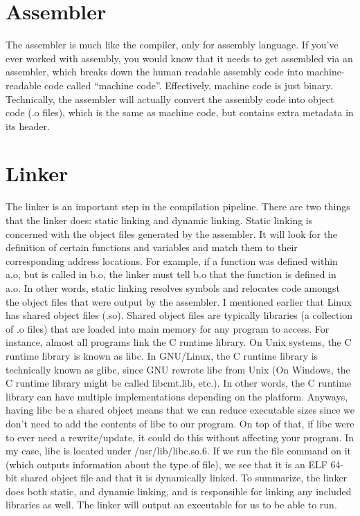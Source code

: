 \documentclass{article}
\begin{document}
\section{Assembler}

The assembler is much like the compiler, only for assembly language. If you’ve ever worked with assembly, you
would know that it needs to get assembled via an assembler, which breaks down the human readable assembly
code into machine-readable code called “machine code”. Effectively, machine code is just binary. Technically,
the assembler will actually convert the assembly code into object code (.o files), which is the same as
machine code, but contains extra metadata in its header.

\section{Linker}

The linker is an important step in the compilation pipeline. There are two things that the linker does:
static linking and dynamic linking. Static linking is concerned with the object files generated by the
assembler. It will look for the definition of certain functions and variables and match them to their
corresponding address locations. For example, if a function was defined within a.o, but is called in b.o, the
linker must tell b.o that the function is defined in a.o. In other words, static linking resolves symbols and
relocates code amongst the object files that were output by the assembler. I mentioned earlier that Linux has
shared object files (.so). Shared object files are typically libraries (a collection of .o files) that are
loaded into main memory for any program to access. For instance, almost all programs link the C runtime
library. On Unix systems, the C runtime library is known as libc. In GNU/Linux, the C runtime library is
technically known as glibc, since GNU rewrote libc from Unix (On Windows, the C runtime library might be
called libcmt.lib, etc.). In other words, the C runtime library can have multiple implementations depending
on the platform. Anyways, having libc be a shared object means that we can reduce executable sizes since we
don’t need to add the contents of libc to our program. On top of that, if libc were to ever need a
rewrite/update, it could do this without affecting your program. In my case, libc is located under
/usr/lib/libc.so.6. If we run the file command on it (which outputs information about the type of file), we
see that it is an ELF 64-bit shared object file and that it is dynamically linked. To summarize, the linker
does both static, and dynamic linking, and is responsible for linking any included libraries as well. The
linker will output an executable for us to be able to run.
\end{document}
